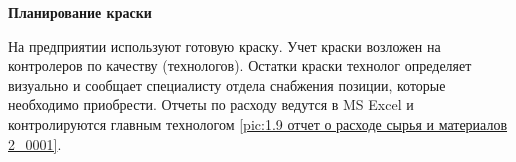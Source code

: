 \textbf{Планирование краски}

На предприятии используют готовую краску. Учет краски возложен на контролеров по качеству (технологов). Остатки  краски технолог определяет визуально и сообщает специалисту отдела снабжения позиции, которые необходимо приобрести. Отчеты по расходу ведутся в MS Excel и контролируются главным технологом  \ref{pic:1.9 отчет о расходе сырья и материалов 2_0001}.









